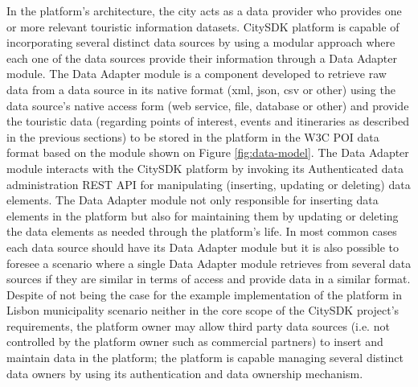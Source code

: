 \documentclass[times]{ettauth}
\begin{document}
In the platform's architecture, the city acts as a data provider who provides one or more relevant touristic information datasets. CitySDK platform is capable of incorporating several distinct data sources by using a modular approach where each one of the data sources provide their information through a Data Adapter module. The Data Adapter module is a component developed to retrieve raw data from a data source in its native format (xml, json, csv or other) using the data source's native access form (web service, file, database or other) and provide the touristic data (regarding points of interest, events and itineraries as described in the previous sections) to be stored in the platform in the W3C POI data format based on the module shown on Figure \ref{fig:data-model}. The Data Adapter module interacts with the CitySDK platform by invoking its Authenticated data administration REST API for manipulating (inserting, updating or deleting) data elements. The Data Adapter module not only responsible for inserting data elements in the platform but also for maintaining them by updating or deleting the data elements as needed through the platform's life. In most common cases each data source should have its Data Adapter module but it is also possible to foresee a scenario where a single Data Adapter module retrieves from several data sources if they are similar in terms of access and provide data in a similar format. Despite of not being the case for the example implementation of the platform in Lisbon municipality scenario neither in the core scope of the CitySDK project's requirements, the platform owner may allow third party data sources (i.e. not controlled by the platform owner such as commercial partners) to insert and maintain data in the platform; the platform is capable managing several distinct data owners by using its authentication and data ownership mechanism.
\end{document}
